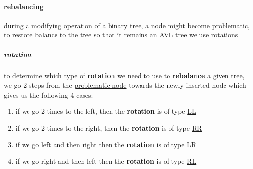 \documentclass[a4paper,12pt]{article}
\begin{document}
\paragraph{rebalancing}
\label{sec:org224f44b}
during a modifying operation of a \hyperref[sec:org254f5f7]{binary tree}, a node might become \hyperref[sec:org634a573]{problematic}, to restore balance to the tree so that it remains an \hyperref[sec:orge9da911]{AVL tree} we use \hyperref[sec:orgcca3d84]{rotation}s\\[0pt]
\subparagraph{rotation}
\label{sec:orgcca3d84}
to determine which type of \textbf{rotation} we need to use to \textbf{rebalance} a given tree, we go 2 steps from the \hyperref[sec:org634a573]{problematic node} towards the newly inserted node which gives us the following 4 cases:\\[0pt]
\begin{enumerate}
\item if we go 2 times to the left, then the \textbf{rotation} is of type \hyperref[sec:orga4dd83f]{LL}\\[0pt]
\item if we go 2 times to the right, then the \textbf{rotation} is of type \hyperref[sec:orgae1b93d]{RR}\\[0pt]
\item if we go left and then right then the \textbf{rotation} is of type \hyperref[sec:org9aa5be8]{LR}\\[0pt]
\item if we go right and then left then the \textbf{rotation} is of type \hyperref[sec:org56c5343]{RL}\\[0pt]
\end{enumerate}
\end{document}
